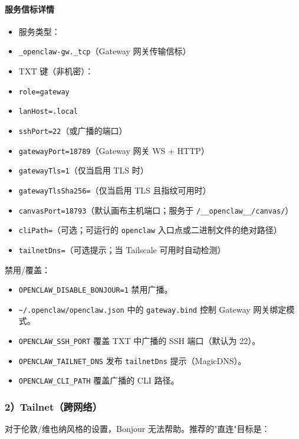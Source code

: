 \paragraph{服务信标详情}


\begin{itemize}
  \item 服务类型：
  \item \texttt{\_openclaw-gw.\_tcp}（Gateway 网关传输信标）
  \item TXT 键（非机密）：
  \item \texttt{role=gateway}
  \item \texttt{lanHost=.local}
  \item \texttt{sshPort=22}（或广播的端口）
  \item \texttt{gatewayPort=18789}（Gateway 网关 WS + HTTP）
  \item \texttt{gatewayTls=1}（仅当启用 TLS 时）
  \item \texttt{gatewayTlsSha256=}（仅当启用 TLS 且指纹可用时）
  \item \texttt{canvasPort=18793}（默认画布主机端口；服务于 \texttt{/\_\_openclaw\_\_/canvas/}）
  \item \texttt{cliPath=}（可选；可运行的 \texttt{openclaw} 入口点或二进制文件的绝对路径）
  \item \texttt{tailnetDns=}（可选提示；当 Tailscale 可用时自动检测）
\end{itemize}


禁用/覆盖：

\begin{itemize}
  \item \texttt{OPENCLAW\_DISABLE\_BONJOUR=1} 禁用广播。
  \item \texttt{\textasciitilde{}/.openclaw/openclaw.json} 中的 \texttt{gateway.bind} 控制 Gateway 网关绑定模式。
  \item \texttt{OPENCLAW\_SSH\_PORT} 覆盖 TXT 中广播的 SSH 端口（默认为 22）。
  \item \texttt{OPENCLAW\_TAILNET\_DNS} 发布 \texttt{tailnetDns} 提示（MagicDNS）。
  \item \texttt{OPENCLAW\_CLI\_PATH} 覆盖广播的 CLI 路径。
\end{itemize}


\subsubsection{2）Tailnet（跨网络）}


对于伦敦/维也纳风格的设置，Bonjour 无法帮助。推荐的"直连"目标是：


